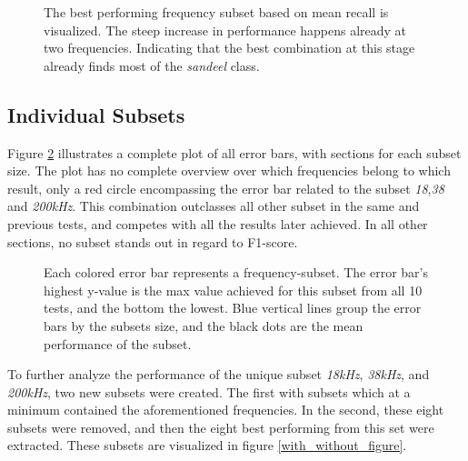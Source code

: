         \clearpage
        \begin{figure}[H]
            \centering
            
            \caption[Best frequency combination - Recall]{The best performing frequency subset based on mean recall is visualized. The steep increase in performance happens already at two frequencies. Indicating that the best combination at this stage already finds most of the \textit{sandeel} class.}
          	\medskip 
            \label{increasing_freq_recall_score_fig}
        \end{figure}

    \subsection{Individual Subsets}
        Figure \ref{errorbar_fig} illustrates a complete plot of all error bars, with sections for each subset size. The plot has no complete overview over which frequencies belong to which result, only a red circle encompassing the error bar related to the subset \textit{18},\textit{38} and \textit{200kHz}. This combination outclasses all other subset in the same and previous tests, and competes with all the results later achieved. In all other sections, no subset stands out in regard to F1-score.
        \clearpage
        \begin{figure}[H]
            \centering
                        
            \caption[Error bars per combination]{Each colored error bar represents a frequency-subset. The error bar's highest y-value is the max value achieved for this subset from all 10 tests, and the bottom the lowest. Blue vertical lines group the error bars by the subsets size, and the black dots are the mean performance of the subset.}
          	\medskip 
            \label{errorbar_fig}
        \end{figure}
    
        To further analyze the performance of the unique subset \textit{18kHz}, \textit{38kHz}, and \textit{200kHz}, two new subsets were created. The first with subsets which at a minimum contained the aforementioned frequencies. In the second, these eight subsets were removed, and then the eight best performing from this set were extracted. These subsets are visualized in figure \ref{with_without_figure}.
        
